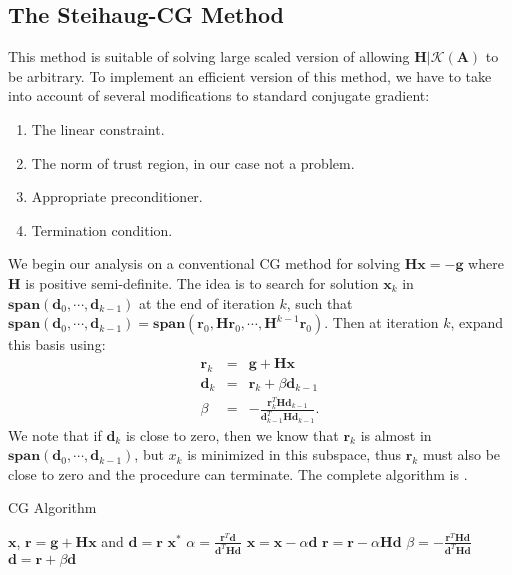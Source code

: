 \documentclass[annual]{acmsiggraph}
\newcommand{\E}[1]{\mathbf{#1}}
\begin{document}
\subsection{The Steihaug-CG Method}
This method is suitable of solving large scaled version of  allowing $\E{H}|\mathcal{K}(\E{A})$ to be arbitrary. To implement an efficient version of this method, we have to take into account of several modifications to standard conjugate gradient:
\begin{enumerate}
\item The linear constraint.
\item The norm of trust region, in our case not a problem.
\item Appropriate preconditioner.
\item Termination condition.
\end{enumerate}

We begin our analysis on a conventional CG method for solving $\E{H}\E{x}=-\E{g}$ where $\E{H}$ is positive semi-definite. The idea is to search for solution $\E{x}_k$ in $\E{span}(\E{d}_0,\cdots,\E{d}_{k-1})$ at the end of iteration $k$, such that $\E{span}(\E{d}_0,\cdots,\E{d}_{k-1})=\E{span}(\E{r}_0,\E{H}\E{r}_0,\cdots,\E{H}^{k-1}\E{r}_0)$. Then at iteration $k$, expand this basis using:
\begin{eqnarray*}
\E{r}_k&=&\E{g}+\E{H}\E{x}	\\
\E{d}_k&=&\E{r}_k+\beta\E{d}_{k-1}	\\
\beta&=&-\frac{\E{r}_k^T\E{H}\E{d}_{k-1}}{\E{d}_{k-1}^T\E{H}\E{d}_{k-1}}.
\end{eqnarray*}
We note that if $\E{d}_k$ is close to zero, then we know that $\E{r}_k$ is almost in $\E{span}(\E{d}_0,\cdots,\E{d}_{k-1})$, but $x_k$ is minimized in this subspace, thus $\E{r}_k$ must also be close to zero and the procedure can terminate. The complete algorithm is .
\begin{algorithm}[h]
\caption{CG Algorithm}
\label{alg:CG}
\begin{algorithmic}
\REQUIRE $\E{x}$, $\E{r}=\E{g}+\E{H}\E{x}$ and $\E{d}=\E{r}$
\ENSURE $\E{x}^*$
\WHILE{$\|\E{r}\|$ not small}
\STATE $\alpha=\frac{\E{r}^T\E{d}}{\E{d}^T\E{H}\E{d}}$
\STATE $\E{x}=\E{x}-\alpha\E{d}$
\STATE $\E{r}=\E{r}-\alpha\E{H}\E{d}$
\STATE $\beta=-\frac{\E{r}^T\E{H}\E{d}}{\E{d}^T\E{H}\E{d}}$
\STATE $\E{d}=\E{r}+\beta\E{d}$
\ENDWHILE
\end{algorithmic}
\end{algorithm}
\end{document}
